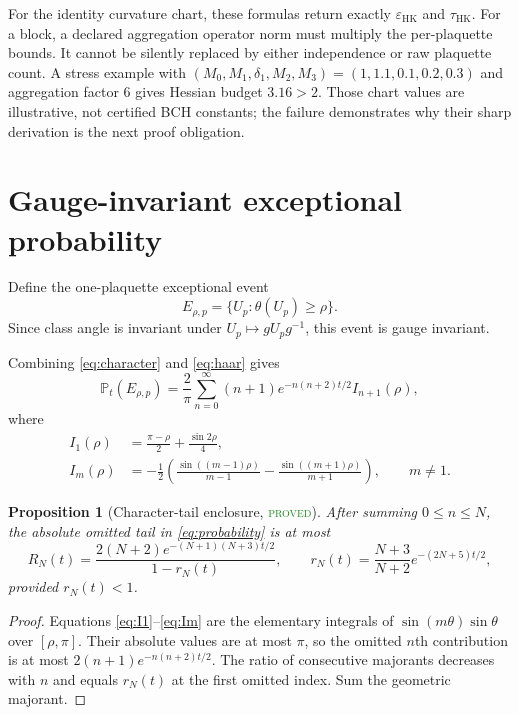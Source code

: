 \documentclass[11pt]{article}
\newtheorem{proposition}[theorem]{Proposition}
\theoremstyle{definition}
\newcommand{\statusproved}{\textcolor{ForestGreen}{\textsc{proved}}}
\begin{document}
For the identity curvature chart, these formulas return exactly
$\varepsilon_{\mathrm{HK}}$ and $\tau_{\mathrm{HK}}$.  For a block, a declared
aggregation operator norm must multiply the per-plaquette bounds.  It cannot
be silently replaced by either independence or raw plaquette count.  A stress
example with $(M_0,M_1,\delta_1,M_2,M_3)=(1,1.1,0.1,0.2,0.3)$ and aggregation
factor $6$ gives Hessian budget $3.16>2$.  Those chart values are illustrative,
not certified BCH constants; the failure demonstrates why their sharp
derivation is the next proof obligation.

\section{Gauge-invariant exceptional probability}

Define the one-plaquette exceptional event
\begin{equation}\label{eq:event}
 E_{\rho,p}=\{U_p:\theta(U_p)\ge\rho\}.
\end{equation}
Since class angle is invariant under $U_p\mapsto gU_pg^{-1}$, this event is
gauge invariant.

Combining \eqref{eq:character} and \eqref{eq:haar} gives
\begin{equation}\label{eq:probability}
 \mathbb P_t(E_{\rho,p})
 =\frac{2}{\pi}\sum_{n=0}^{\infty}(n+1)e^{-n(n+2)t/2}I_{n+1}(\rho),
\end{equation}
where
\begin{align}
 I_1(\rho)&=\frac{\pi-\rho}{2}+\frac{\sin2\rho}{4},\label{eq:I1}\\
 I_m(\rho)&=-\frac12\left(
 \frac{\sin((m-1)\rho)}{m-1}
 -\frac{\sin((m+1)\rho)}{m+1}
 \right),\qquad m\ne1.\label{eq:Im}
\end{align}

\begin{proposition}[Character-tail enclosure, \statusproved]
\label{prop:probability}
After summing $0\le n\le N$, the absolute omitted tail in
\eqref{eq:probability} is at most
\begin{equation}\label{eq:char-tail}
 R_N(t)=\frac{2(N+2)e^{-(N+1)(N+3)t/2}}{1-r_N(t)},
 \qquad
 r_N(t)=\frac{N+3}{N+2}e^{-(2N+5)t/2},
\end{equation}
provided $r_N(t)<1$.
\end{proposition}
\begin{proof}
Equations \eqref{eq:I1}--\eqref{eq:Im} are the elementary integrals of
$\sin(m\theta)\sin\theta$ over $[\rho,\pi]$.  Their absolute values are at most
$\pi$, so the omitted $n$th contribution is at most
$2(n+1)e^{-n(n+2)t/2}$.  The ratio of consecutive majorants decreases with
$n$ and equals $r_N(t)$ at the first omitted index.  Sum the geometric
majorant.
\end{proof}
\end{document}
